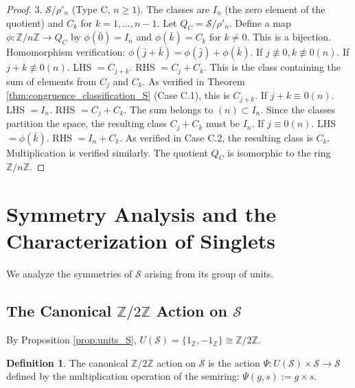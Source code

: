 \documentclass[11pt, a4paper]{article}
\theoremstyle{plain}
\theoremstyle{definition}
\newtheorem{definition}[theorem]{Definition}
\numberwithin{equation}{section}
\newcommand{\Z}{\mathbb{Z}}
\newcommand{\SemiringS}{\mathcal{S}}
\newcommand{\Ztwo}{\mathbb{Z}/2\mathbb{Z}}
\begin{document}
\begin{proof}
3. $\SemiringS/\rho'_n$ (Type C, $n\ge 1$). The classes are $I_n$ (the zero element of the quotient) and $C_k$ for $k=1,\dots, n-1$. Let $Q_C = \SemiringS/\rho'_n$.
Define a map $\phi: \Z/n\Z \to Q_C$ by $\phi(\bar{0})=I_n$ and $\phi(\bar{k})=C_k$ for $k\neq 0$.
This is a bijection.
Homomorphism verification: $\phi(\bar{j}+\bar{k}) = \phi(\bar{j})+\phi(\bar{k})$.
If $j\not\equiv 0, k\not\equiv 0 (n)$.
If $j+k \not\equiv 0(n)$. LHS $= C_{j+k}$. RHS $= C_j+C_k$. This is the class containing the sum of elements from $C_j$ and $C_k$. As verified in Theorem \ref{thm:congruence_classification_S} (Case C.1), this is $C_{j+k}$.
If $j+k \equiv 0(n)$. LHS $= I_n$. RHS $= C_j+C_k$. The sum belongs to $(n) \subset I_n$. Since the classes partition the space, the resulting class $C_j+C_k$ must be $I_n$.
If $j\equiv 0(n)$. LHS $=\phi(\bar{k})$. RHS $=I_n+C_k$. As verified in Case C.2, the resulting class is $C_k$.
Multiplication is verified similarly. The quotient $Q_C$ is isomorphic to the ring $\Z/n\Z$.
\end{proof}

\section{Symmetry Analysis and the Characterization of Singlets}

We analyze the symmetries of $\SemiringS$ arising from its group of units.

\subsection{The Canonical $\Ztwo$ Action on $\SemiringS$}

By Proposition \ref{prop:units_S}, $U(\SemiringS) = \{1_{\Z}, -1_{\Z}\} \cong \Ztwo$.

\begin{definition}
The canonical $\Ztwo$ action on $\SemiringS$ is the action $\Psi: U(\SemiringS) \times \SemiringS \to \SemiringS$ defined by the multiplication operation of the semiring: $\Psi(g, s) := g \times s$.
\end{definition}
\end{document}
